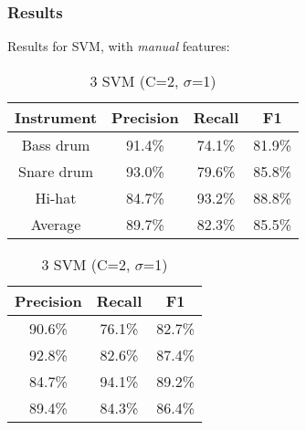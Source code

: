 \documentclass{beamer}
\begin{document}
    \begin{frame}
        \frametitle{Results}
        Results for SVM, with \emph{manual} features:
        \begin{center}
        \footnotesize 
        \begin{table}
        \parbox{.50\linewidth}{       
        \caption{SVM (C=2, $\sigma$=1)}
        \begin{tabular}{|c|c|c|c|}
        \hline
        Instrument&Precision&Recall&F1\\
        \hline
        Bass drum&91.4\%&74.1\%&81.9\%\\
        \hline
        Snare drum&93.0\%&79.6\%&85.8\%\\
        \hline
        Hi-hat&84.7\%&93.2\%&88.8\%\\
        \hline
        Average&89.7\%&82.3\%&85.5\%\\
        \hline
        \end{tabular}
        }
        \hfill
        \parbox{.40\linewidth}{
        \caption{3 SVM (C=2, $\sigma$=1)}
        \begin{tabular}{|c|c|c|}
        \hline
        Precision&Recall&F1\\
        \hline
        90.6\%&76.1\%&82.7\%\\
        \hline
        92.8\%&82.6\%&87.4\%\\
        \hline
        84.7\%&94.1\%&89.2\%\\
        \hline
        89.4\%&84.3\%&86.4\%\\
        \hline
        \end{tabular}
        }
        \end{table}

        \end{center}
    \end{frame}
    
\end{document}
